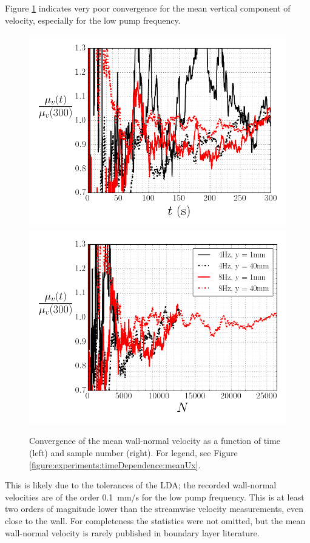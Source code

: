 \documentclass[12pt,oneside,a4paper]{article}
\begin{document}
Figure \ref{figure:experiments:timeDependence:meanUy} indicates very poor convergence for the mean vertical component of velocity, especially for the low pump frequency.
%
\begin{figure}[!h]
\centering
\includegraphics[width=0.5\linewidth]{images/LDA_timeDependenceImages/UyMeanTConvergence.png}\hfill
\includegraphics[width=0.5\linewidth]{images/LDA_timeDependenceImages/UyMeanNConvergence.png}\\
\caption{Convergence of the mean wall-normal velocity as a function of time (left) and sample number (right). For legend, see Figure \ref{figure:experiments:timeDependence:meanUx}.}
\label{figure:experiments:timeDependence:meanUy}
\end{figure}
%
 This is likely due to the tolerances of the LDA; the recorded wall-normal velocities are of the order  \SI{0.1}{mm/s} for the low pump frequency. This is at least two orders of magnitude lower than the streamwise velocity measurements, even close to the wall. For completeness the statistics were not omitted, but the mean wall-normal velocity is rarely published in boundary layer literature. 
\end{document}
